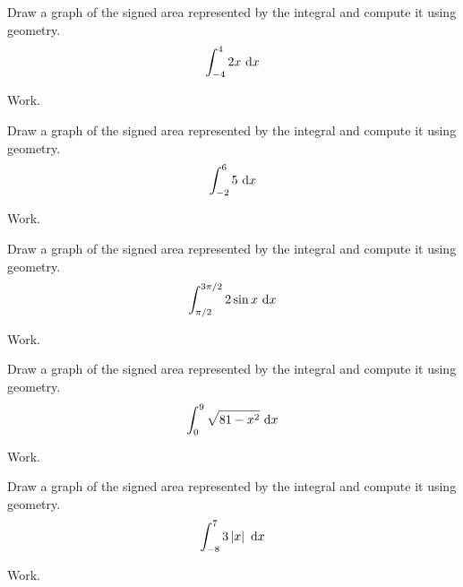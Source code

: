 \documentclass[12pt,addpoints, answers, fleqn]{exam}
\begin{document}
\begin{teacher}
\begin{questions}


\question 	%

Draw a graph of the signed area represented by the integral and compute it using geometry.
\[
\int_{-4}^4 2x \ {\rm{d}}x
\]

\begin{solution}
Work.
\end{solution}


\question 	%

Draw a graph of the signed area represented by the integral and compute it using geometry.
\[
\int_{-2}^6 5 \ {\rm{d}}x
\]

\begin{solution}
Work.
\end{solution}

\question 	%

Draw a graph of the signed area represented by the integral and compute it using geometry.
\[
\int_{\pi/2}^{3\pi/2} 2 \sin x \ {\rm{d}}x
\]

\begin{solution}
Work.
\end{solution}

\question 	%

Draw a graph of the signed area represented by the integral and compute it using geometry.
\[
\int_{0}^{9}  \sqrt{81-x^2} \ {\rm{d}}x
\]

\begin{solution}
Work.
\end{solution}

\question 	%

Draw a graph of the signed area represented by the integral and compute it using geometry.
\[
\int_{-8}^{7} 3 \left| x \right| \ {\rm{d}}x
\]

\begin{solution}
Work.
\end{solution}







\end{questions}
\end{teacher}
\end{document}
